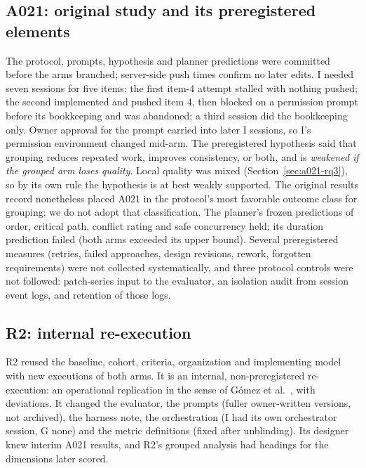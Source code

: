 \documentclass[10pt,conference]{IEEEtran}
\newcommand{\G}{G}
\newcommand{\I}{I}
\begin{document}
\subsection{A021: original study and its preregistered elements}
The protocol, prompts, hypothesis and planner predictions were committed before the arms branched; server-side push times confirm no later edits. %
\I{} needed seven sessions for five items: the first item-4 attempt stalled with nothing pushed; the second implemented and pushed item 4, then blocked on a permission prompt before its bookkeeping and was abandoned; a third session did the bookkeeping only. Owner approval for the prompt carried into later \I{} sessions, so \I's permission environment changed mid-arm. %
The preregistered hypothesis said that grouping reduces repeated work, improves consistency, or both, and is \emph{weakened if the grouped arm loses quality}. Local quality was mixed (Section~\ref{sec:a021-rq3}), so by its own rule the hypothesis is at best weakly supported. The original results record nonetheless placed A021 in the protocol's most favorable outcome class for grouping; we do not adopt that classification. The planner's frozen predictions of order, critical path, conflict rating and safe concurrency held; its duration prediction failed (both arms exceeded its upper bound). Several preregistered measures (retries, failed approaches, design revisions, rework, forgotten requirements) were not collected systematically, and three protocol controls were not followed: patch-series input to the evaluator, an isolation audit from session event logs, and retention of those logs. %

\subsection{R2: internal re-execution}
R2 reused the baseline, cohort, criteria, organization and implementing model with new executions of both arms. It is an internal, non-preregistered re-execution: an operational replication in the sense of G\'omez et al.~\cite{gomez2014understanding}, with deviations. It changed the evaluator, the prompts (fuller owner-written versions, not archived), the harness note, the orchestration (\I{} had its own orchestrator session, \G{} none) and the metric definitions (fixed after unblinding). Its designer knew interim A021 results, and R2's grouped analysis had headings for the dimensions later scored. %
\end{document}
